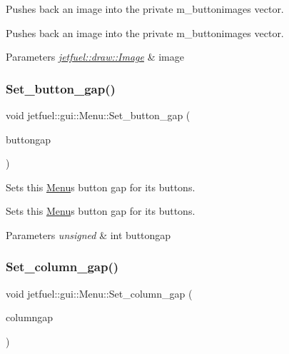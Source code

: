 Pushes back an image into the private m\+\_\+buttonimages vector. 

Pushes back an image into the private m\+\_\+buttonimages vector.


\begin{DoxyParams}{Parameters}
{\em \hyperlink{classjetfuel_1_1draw_1_1Image}{jetfuel\+::draw\+::\+Image}} & image \\
\hline
\end{DoxyParams}
\mbox{\label{classjetfuel_1_1gui_1_1Menu_a8b715d2e92f18b77eb78e7a8e4fc8208}} 
\subsubsection{\texorpdfstring{Set\+\_\+button\+\_\+gap()}{Set\_button\_gap()}}
{\footnotesize\ttfamily void jetfuel\+::gui\+::\+Menu\+::\+Set\+\_\+button\+\_\+gap (\begin{DoxyParamCaption}\item[{const unsigned int}]{buttongap }\end{DoxyParamCaption})\hspace{0.3cm}{\ttfamily [inline]}}



Sets this \hyperlink{classjetfuel_1_1gui_1_1Menu}{Menu}\textquotesingle{}s button gap for it\textquotesingle{}s buttons. 

Sets this \hyperlink{classjetfuel_1_1gui_1_1Menu}{Menu}\textquotesingle{}s button gap for it\textquotesingle{}s buttons.


\begin{DoxyParams}{Parameters}
{\em unsigned} & int buttongap \\
\hline
\end{DoxyParams}
\mbox{\label{classjetfuel_1_1gui_1_1Menu_a584ce362f2efe836a9cfff9729eac913}} 
\subsubsection{\texorpdfstring{Set\+\_\+column\+\_\+gap()}{Set\_column\_gap()}}
{\footnotesize\ttfamily void jetfuel\+::gui\+::\+Menu\+::\+Set\+\_\+column\+\_\+gap (\begin{DoxyParamCaption}\item[{const unsigned int}]{columngap }\end{DoxyParamCaption})\hspace{0.3cm}{\ttfamily [inline]}}



